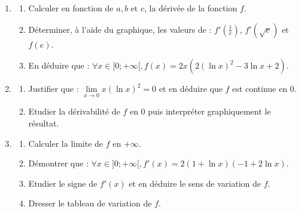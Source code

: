 \documentclass[12pt,a4paper]{article}
\begin{document}
\begin{enumerate}
    \item \begin{enumerate}
        \item Calculer en fonction de $a, b$ et $c$, la dérivée de la fonction $f$.
        \item Déterminer, à l'aide du graphique, les valeurs de : $f'\left( \frac{1}{e}\right) $, $f'\left( \sqrt{e}\right) $ et $f(e)$.
        \item En déduire que : $\forall x \in ]0; +\infty[, f(x) = 2x(2(\ln x)^2 - 3\ln x + 2)$.
    \end{enumerate}
    \item \begin{enumerate}
        \item Justifier que : $\lim\limits_{x \to 0} x(\ln x)^2 = 0$ et en déduire que $f$ est continue en 0.
        \item Etudier la dérivabilité de $f$ en 0 puis interpréter graphiquement le résultat.
    \end{enumerate}
    \item \begin{enumerate}
        \item Calculer la limite de $f$ en $+\infty$.
        \item Démontrer que : $\forall x \in ]0; +\infty[, f'(x) = 2(1 + \ln x)(-1 + 2\ln x)$.
        \item Etudier le signe de $f'(x)$ et en déduire le sens de variation de $f$.
        \item Dresser le tableau de variation de $f$.
    \end{enumerate}
\end{enumerate}

\vspace{0.5cm}
\end{document}
